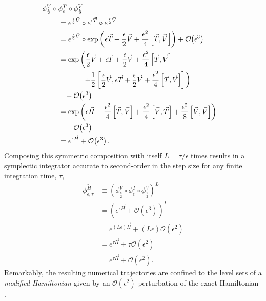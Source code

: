 \documentclass{article}
\begin{document}
\begin{align*}
\phi^{V}_{\frac{\epsilon}{2}} \circ 
\phi^{T}_{\epsilon} \circ 
\phi^{V}_{\frac{\epsilon}{2}}
\\
& \hspace{-12mm} =
e^{\frac{\epsilon}{2} \vec{V} } \circ 
e^{\epsilon \vec{T} } \circ 
e^{\frac{\epsilon}{2} \vec{V} }
\\
& \hspace{-12mm} =
e^{\frac{\epsilon}{2} \vec{V} } \circ 
\exp \left( \epsilon \vec{T} + \frac{\epsilon}{2} \vec{V} 
+ \frac{\epsilon^{2}}{4} \left[ \vec{T}, \vec{V} \right] \right)
+ \mathcal{O} \! \left( \epsilon^{3} \right)
\\
& \hspace{-12mm} =
\exp \left( 
\frac{\epsilon}{2} \vec{V} + \epsilon \vec{T} + \frac{\epsilon}{2} \vec{V} 
+ \frac{\epsilon^{2}}{4} \left[ \vec{T}, \vec{V} \right]
\right.
\\
& \hspace{0mm} \left.
+ \frac{1}{2} \left[ \frac{\epsilon}{2} \vec{V}, \epsilon \vec{T} + \frac{\epsilon}{2} \vec{V} 
+ \frac{\epsilon^{2}}{4} \left[ \vec{T}, \vec{V} \right] \right]
\right)
\\
& \hspace{-9mm}
+ \mathcal{O} \! \left( \epsilon^{3} \right)
\\
& \hspace{-12mm} =
\exp \left( 
\epsilon \vec{H} 
+ \frac{\epsilon^{2}}{4} \left[ \vec{T}, \vec{V} \right] +\frac{\epsilon^{2}}{4} \left[ \vec{V}, \vec{T} \right] 
+ \frac{\epsilon^{2}}{8} \left[ \vec{V}, \vec{V} \right]
\right)
\\
& \hspace{-9mm}
+ \mathcal{O} \! \left( \epsilon^{3} \right)
\\
& \hspace{-12mm} =
e^{ \epsilon \vec{H} }
+ \mathcal{O} \! \left( \epsilon^{3} \right).
\end{align*}
%
Composing this symmetric composition with itself $L = \tau / \epsilon$ times results in 
a symplectic integrator accurate to second-order in the step size for any finite integration 
time, $\tau$,
%
\begin{align*}
\phi^{\widetilde{H}}_{\epsilon, \tau}
&\equiv
\left( \phi^{V}_{\frac{\epsilon}{2}} \circ 
\phi^{T}_{\epsilon} \circ 
\phi^{V}_{\frac{\epsilon}{2}} \right)^{L}
\\
&=
\left( e^{ \epsilon \vec{H} }
+ \mathcal{O} \! \left( \epsilon^{3} \right) \right)^{L}
\\
&=
e^{ \left( L \epsilon \right) \vec{H} }
+ \left( L \epsilon \right) \mathcal{O} \! \left( \epsilon^{2} \right)
\\
&=
e^{ \tau \vec{H} }
+ \tau \mathcal{O} \! \left( \epsilon^{2} \right)
\\
&=
e^{ \tau \vec{H} }
+ \mathcal{O} \! \left( \epsilon^{2} \right).
\end{align*}
%
Remarkably, the resulting numerical trajectories are confined to the level sets
of a \textit{modified Hamiltonian} given by an $\mathcal{O} \! \left( \epsilon^{2} \right)$
perturbation of the exact Hamiltonian \cite{HairerEtAl:2006, BetancourtEtAl:2014b}.
\end{document}
